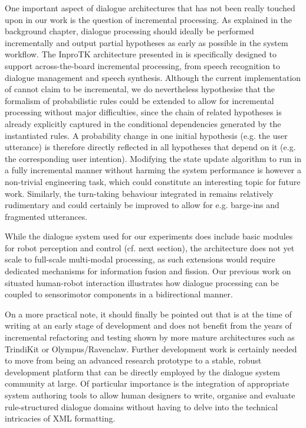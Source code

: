 One important aspect of dialogue architectures that has not been really touched upon in our work is the question of incremental processing.  As explained in the background chapter, dialogue processing should ideally be performed incrementally and output partial hypotheses as early as possible in the system workflow. The InproTK architecture presented in \cite{schlangen2009general,Baumann:2012} is specifically designed to support across-the-board incremental processing, from speech recognition to dialogue management and speech synthesis. Although the current implementation of \opendial cannot claim to be incremental, we do nevertheless hypothesise that the formalism of probabilistic rules could be extended to allow for incremental processing without major difficulties, since the chain of related hypotheses is already explicitly captured in the conditional dependencies generated by the instantiated rules.  A probability change in one initial hypothesis (e.g. the user utterance) is therefore directly reflected in all hypotheses that depend on it (e.g. the corresponding user intention). Modifying the state update algorithm to run in a fully incremental manner without harming the system performance is however a non-trivial engineering task, which could constitute an interesting topic for future work. Similarly, the turn-taking behaviour integrated in \opendial remains relatively rudimentary and could certainly be improved to allow for e.g. barge-ins and fragmented utterances.

While the dialogue system used for our experiments does include basic modules for robot perception and control (cf. next section), the architecture does not yet scale to full-scale multi-modal processing, as such extensions would require dedicated mechanisms for information fusion and fission. Our previous work on situated human-robot interaction \citep{cosybook:dialogue} illustrates how dialogue processing can be coupled to sensorimotor components in a bidirectional manner.  

On a more practical note, it should finally be pointed out that \opendial is at the time of writing at an early stage of development and does not benefit from the years of incremental refactoring and testing shown by more mature architectures such as TrindiKit or Olympus/Ravenclaw. Further development work is certainly needed to move \opendial from being an advanced research prototype to a stable, robust development platform that can be directly employed by the dialogue system community at large. Of particular importance is the integration of appropriate system authoring tools to allow human designers to write, organise and evaluate rule-structured dialogue domains without having to delve into the technical intricacies of XML formatting.

